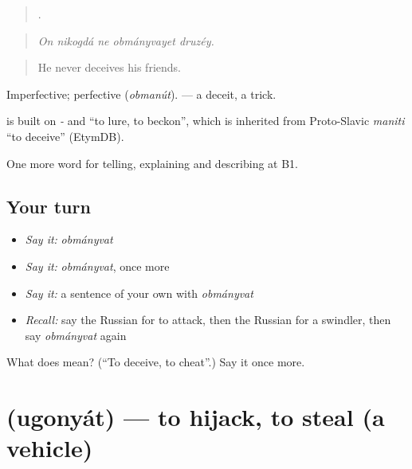 \begin{quote}
    .
\end{quote}

\begin{quote}
\emph{On nikogdá ne obmányvayet druzéy.}
\end{quote}

\begin{quote}
He never deceives his friends.
\end{quote}

Imperfective; perfective \emph{} (\emph{obmanút}). \emph{} — a deceit, a trick.

\begin{cousinweb}
\emph{} is built on \emph{-} and \emph{} \textquotedblleft{}to lure, to beckon\textquotedblright{}, which is inherited from Proto-Slavic \emph{maniti} \textquotedblleft{}to deceive\textquotedblright{} (EtymDB).
\end{cousinweb}

\begin{grammarlens}[title={What you've built}]
One more word for telling, explaining and describing at B1.
\end{grammarlens}

\subsection*{Your turn}
\begin{itemize}
\raggedright
  \item \emph{Say it:} \emph{obmányvat}
  \item \emph{Say it:} \emph{obmányvat}, once more
  \item \emph{Say it:} a sentence of your own with \emph{obmányvat}
  \item \emph{Recall:} say the Russian for to attack, then the Russian for a swindler, then say \emph{obmányvat} again
\end{itemize}

\begin{tcolorbox}[breakable,colback=teal!4,colframe=teal!35!black,title={Before you move on}]
What does  mean? (\textquotedblleft{}To deceive, to cheat\textquotedblright{}.) Say it once more.
\end{tcolorbox}
\section[\texorpdfstring{\ru{угонять} (ugonyát)}{угонять (ugonyát)}]{ (ugonyát) — to hijack, to steal (a vehicle)}

